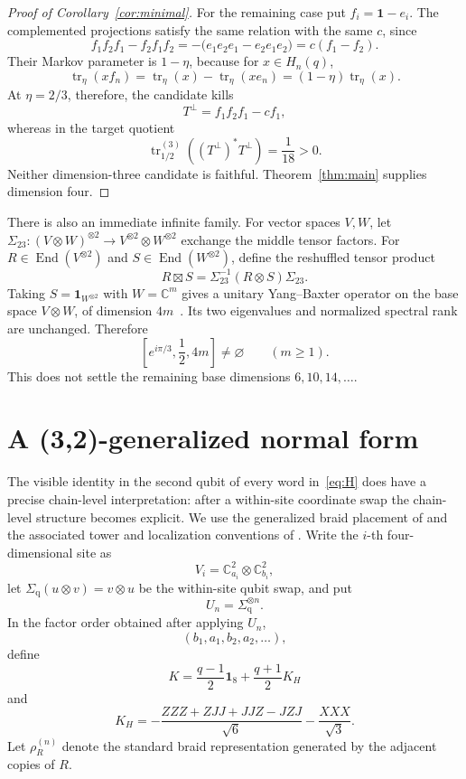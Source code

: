 \documentclass[11pt]{article}
\theoremstyle{remark}
\newcommand{\Id}{\mathbf 1}
\newcommand{\End}{\operatorname{End}}
\newcommand{\bbC}{\mathbb C}
\newcommand{\boxt}{\mathbin{\boxtimes}}
\begin{document}
\begin{proof}[Proof of Corollary~\ref{cor:minimal}]
For the remaining case put \(f_i=\Id-e_i\).  The complemented projections
satisfy the same relation with the same \(c\), since
\[
  f_1f_2f_1-f_2f_1f_2
  =-\bigl(e_1e_2e_1-e_2e_1e_2\bigr)=c(f_1-f_2).
\]
Their Markov parameter is \(1-\eta\), because for \(x\in H_n(q)\),
\[
  \operatorname{tr}_\eta(xf_n)
  =\operatorname{tr}_\eta(x)-\operatorname{tr}_\eta(xe_n)
  =(1-\eta)\operatorname{tr}_\eta(x).
\]
At \(\eta=2/3\), therefore, the candidate kills
\[
  T^\perp=f_1f_2f_1-cf_1,
\]
whereas in the target quotient
\[
  \operatorname{tr}^{(3)}_{1/2}\!\left((T^\perp)^*T^\perp\right)
  =\frac1{18}>0.
\]
Neither dimension-three candidate is faithful.  Theorem~\ref{thm:main}
supplies dimension four.
\end{proof}

There is also an immediate infinite family.  For vector spaces \(V,W\), let
\(\Sigma_{23}:(V\otimes W)^{\otimes2}\to V^{\otimes2}\otimes W^{\otimes2}\)
exchange the middle tensor factors.  For
\(R\in\End(V^{\otimes2})\) and \(S\in\End(W^{\otimes2})\), define the
reshuffled tensor product
\[
  R\boxt S=\Sigma_{23}^{-1}(R\otimes S)\Sigma_{23}.
\]
Taking \(S=\Id_{W^{\otimes2}}\) with \(W=\bbC^m\) gives a unitary
Yang--Baxter operator on the base space \(V\otimes W\), of dimension
\(4m\)~\cite[\S3]{Lechner2026}.  Its two eigenvalues and normalized spectral
rank are unchanged.  Therefore
\begin{equation}
  \left[e^{i\pi/3},\frac12,4m\right]\ne\varnothing
  \qquad(m\ge1).
  \label{eq:amplification}
\end{equation}
This does not settle the remaining base dimensions
\(6,10,14,\ldots\).

\section{A (3,2)-generalized normal form}\label{sec:gybe}

The visible identity in the second qubit of every word in~\eqref{eq:H}
does have a precise chain-level interpretation: after a within-site coordinate
swap the chain-level structure becomes explicit.  We use the generalized braid placement of
\cite[Eq.~(3.9) and Remark~3.10(2)]{GHR2013} and the associated tower and
localization conventions of
\cite[Example~4.23 and Definition~4.24]{GHR2013}.  Write the \(i\)-th
four-dimensional site as
\[
  V_i=\bbC^2_{a_i}\otimes\bbC^2_{b_i},
\]
let \(\Sigma_{\mathrm q}(u\otimes v)=v\otimes u\) be the within-site qubit
swap, and put
\[
  U_n=\Sigma_{\mathrm q}^{\otimes n}.
\]
In the factor order obtained after applying \(U_n\),
\[
  (b_1,a_1,b_2,a_2,\ldots),
\]
define
\[
  K=\frac{q-1}{2}\Id_8+\frac{q+1}{2}K_H
\]
and
\begin{equation}
  K_H=
  -\frac{ZZZ+ZJJ+JJZ-JZJ}{\sqrt6}
  -\frac{XXX}{\sqrt3}.
  \label{eq:KH}
\end{equation}
Let \(\rho_R^{(n)}\) denote the standard braid representation generated by
the adjacent copies of \(R\).
\end{document}
